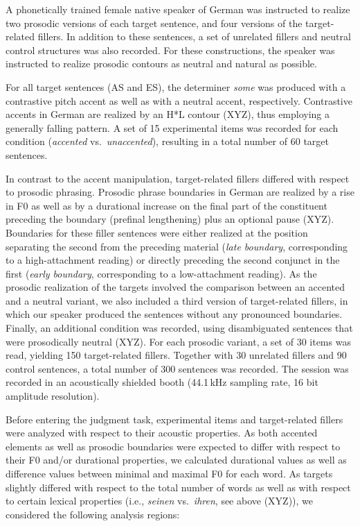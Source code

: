 \documentclass[fleqn,reqno,10pt,draft]{article}
\begin{document}
A phonetically trained female native speaker of German was instructed
to realize two prosodic versions of each target sentence, and four
versions of the target-related fillers. In addition to these
sentences, a set of unrelated fillers and neutral control structures
was also recorded. For these constructions, the speaker was instructed
to realize prosodic contours as neutral and natural as possible.

For all target sentences (AS and ES), the determiner \emph{some} was
produced with a contrastive pitch accent as well as with a neutral
accent, respectively. Contrastive accents in German are realized by an
H*L contour (XYZ), thus employing a generally
falling pattern. A set of 15 experimental items was recorded for each
condition (\emph{accented} vs.~\emph{unaccented}), resulting in a
total number of 60 target sentences.

In contrast to the accent manipulation, target-related fillers
differed with respect to prosodic phrasing. Prosodic phrase boundaries
in German are realized by a rise in F0 as well as by a durational
increase on the final part of the constituent preceding the boundary
(prefinal lengthening) plus an optional pause (XYZ). Boundaries for these filler sentences
were either realized at the position separating the second 
from the preceding material (\emph{late boundary}, corresponding to a
high-attachment reading) or directly preceding the second conjunct in
the first  (\emph{early boundary}, corresponding to a
low-attachment reading). As the prosodic realization of the targets
involved the comparison between an accented and a neutral variant, we
also included a third version of target-related fillers, in which our
speaker produced the sentences without any pronounced
boundaries. Finally, an additional condition was recorded, using
disambiguated sentences that were prosodically neutral (XYZ). For each prosodic variant, a set of
30 items was read, yielding 150 target-related fillers. Together with
30 unrelated fillers and 90 control sentences, a total number of 300
sentences was recorded. The session was recorded in an acoustically
shielded booth (44.1\,kHz sampling rate, 16 bit amplitude resolution).

Before entering the judgment task, experimental items and
target-related fillers were analyzed with respect to their acoustic
properties. As both accented elements as well as prosodic boundaries
were expected to differ with respect to their F0 and/or durational
properties, we calculated durational values as well as difference
values between minimal and maximal F0 for each word. As targets
slightly differed with respect to the total number of words as well as
with respect to certain lexical properties (i.e., \emph{seinen}
vs.~\emph{ihren}, see above (XYZ)), we considered
the following analysis regions:
\end{document}
